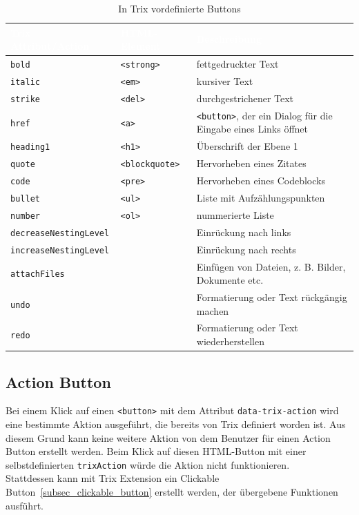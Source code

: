 \begin{table}[H]
	\begin{center}
	\begin{tabularx}{\textwidth}{| p{4cm} | l | X |}
		\hline
		\cellcolor{Gray}\textcolor{White}{Trix Attribut/Action} & \cellcolor{Gray}\textcolor{White}{HTML-Element} & \cellcolor{Gray}\textcolor{White}{Beschreibung} \\
		\hline
		\hline
		\texttt{bold} & \texttt{<strong>} & fettgedruckter Text\\
		\hline
		\texttt{italic} & \texttt{<em>} & kursiver Text\\
		\hline
		\texttt{strike} & \texttt{<del>} & durchgestrichener Text\\
		\hline
		\texttt{href} & \texttt{<a>} & \texttt{<button>}, der ein Dialog für die Eingabe eines Links öffnet\\
		\hline
		\texttt{heading1} & \texttt{<h1>} & Überschrift der Ebene 1\\
		\hline
		\texttt{quote} & \texttt{<blockquote>} & Hervorheben eines Zitates\\
		\hline
		\texttt{code} & \texttt{<pre>} & Hervorheben eines Codeblocks\\
		\hline
		\texttt{bullet} & \texttt{<ul>} & Liste mit Aufzählungspunkten\\
		\hline
		\texttt{number} & \texttt{<ol>} & nummerierte Liste\\
		\hline
		\texttt{decreaseNestingLevel} & & Einrückung nach links\\
		\hline
		\texttt{increaseNestingLevel} & & Einrückung nach rechts\\
		\hline
		\texttt{attachFiles} & & Einfügen von Dateien, z. B. Bilder, Dokumente etc.\\
		\hline
		\texttt{undo} & & Formatierung oder Text rückgängig machen\\
		\hline
		\texttt{redo} & & Formatierung oder Text wiederherstellen\\
		\hline
	\end{tabularx}
	\end{center}
	\caption{In Trix vordefinierte Buttons}
	\label{table:trix_supported_tags}
\end{table}

\subsection{Action Button}
\label{subsec_action_button}

Bei einem Klick auf einen \texttt{<button>} mit dem Attribut \texttt{data-trix-action} wird eine bestimmte Aktion ausgeführt, die
bereits von Trix definiert worden ist. Aus diesem Grund kann keine weitere Aktion von dem Benutzer für einen Action Button erstellt 
werden. Beim Klick auf diesen HTML-Button mit einer selbstdefinierten \texttt{trixAction} würde die Aktion nicht funktionieren. \\
Stattdessen kann mit Trix Extension ein Clickable Button~\ref{subsec_clickable_button} erstellt werden, der übergebene 
Funktionen ausführt. 

